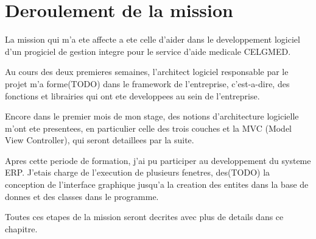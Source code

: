 \chapter{Deroulement de la mission}

La mission qui m'a ete affecte a ete celle d'aider dans le developpement logiciel d'un progiciel de gestion integre pour le service d'aide medicale CELGMED. 

Au cours des deux premieres semaines, l'architect logiciel responsable par le projet m'a forme(TODO) dans le framework de l'entreprise, c'est-a-dire, des fonctions et librairies qui ont ete developpees au sein de l'entreprise.

Encore dans le premier mois de mon stage, des notions d'architecture logicielle m'ont ete presentees, en particulier celle des trois couches et la MVC (Model View Controller), qui seront detaillees par la suite.

Apres cette periode de formation, j'ai pu participer au developpement du systeme ERP. J'etais charge de l'execution de plusieurs fenetres, des(TODO) la conception de l'interface graphique jusqu'a la creation des entites dans la base de donnes et des classes dans le programme.

Toutes ces etapes de la mission seront decrites avec plus de details dans ce chapitre.  

